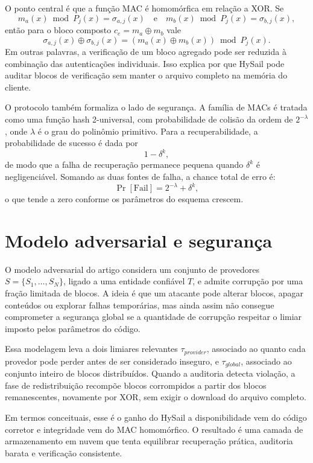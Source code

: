 O ponto central é que a função MAC é homomórfica em relação a XOR. Se
\[
m_a(x) \bmod P_j(x) = \sigma_{a,j}(x) \quad \text{e} \quad m_b(x) \bmod P_j(x) = \sigma_{b,j}(x),
\]
então para o bloco composto \(c_e = m_a \oplus m_b\) vale
\[
\sigma_{a,j}(x) \oplus \sigma_{b,j}(x) = (m_a(x) \oplus m_b(x)) \bmod P_j(x).
\]
Em outras palavras, a verificação de um bloco agregado pode ser reduzida à combinação das autenticações
individuais. Isso explica por que HySail pode auditar blocos de verificação sem manter o arquivo completo na
memória do cliente.

O protocolo também formaliza o lado de segurança. A família de MACs é tratada como uma função hash
2-universal, com probabilidade de colisão da ordem de \(2^{-\lambda}\), onde \(\lambda\) é o grau do
polinômio primitivo. Para a recuperabilidade, a probabilidade de sucesso é dada por
\[
1 - \delta^k,
\]
de modo que a falha de recuperação permanece pequena quando \(\delta^k\) é negligenciável. Somando as duas
fontes de falha, a chance total de erro é:
\[
\Pr[\mathrm{Fail}] = 2^{-\lambda} + \delta^k,
\]
o que tende a zero conforme os parâmetros do esquema crescem.

\section{Modelo adversarial e segurança}%
O modelo adversarial do artigo considera um conjunto de provedores \(S = \{S_1, \ldots, S_N\}\), ligado a
uma entidade confiável \(T\), e admite corrupção por uma fração limitada de blocos. A ideia é que um atacante pode
alterar blocos, apagar conteúdos ou explorar falhas temporárias, mas ainda assim não consegue comprometer a
segurança global se a quantidade de corrupção respeitar o limiar imposto pelos parâmetros do código.

Essa modelagem leva a dois limiares relevantes \(\tau_{provider}\), associado ao quanto cada provedor pode
perder antes de ser considerado inseguro, e \(\tau_{global}\), associado ao conjunto inteiro de blocos
distribuídos. Quando a auditoria detecta violação, a fase de redistribuição recompõe blocos corrompidos a partir
dos blocos remanescentes, novamente por XOR, sem exigir o download do arquivo completo.

Em termos conceituais, esse é o ganho do HySail a disponibilidade vem do código corretor e integridade vem do
MAC homomórfico. O resultado é uma camada de armazenamento em nuvem que tenta equilibrar recuperação prática,
auditoria barata e verificação consistente.
